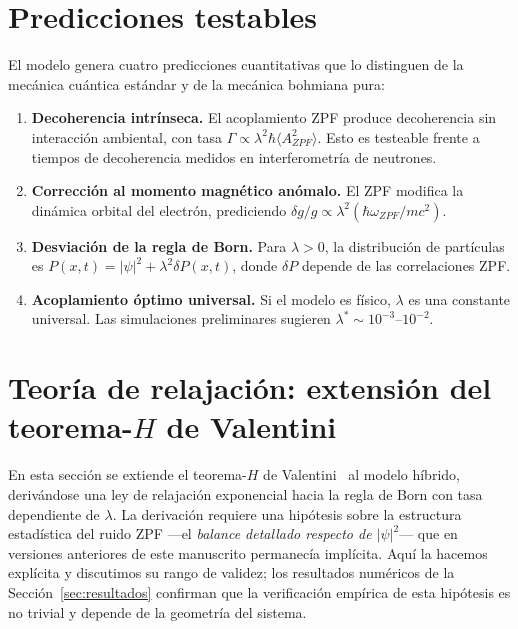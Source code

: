 \documentclass[11pt,a4paper]{article}
\begin{document}
\section{Predicciones testables}
\label{sec:predicciones}

El modelo genera cuatro predicciones cuantitativas que lo distinguen de
la mecánica cuántica estándar y de la mecánica bohmiana pura:
\begin{enumerate}
\item \textbf{Decoherencia intrínseca.} El acoplamiento ZPF produce
decoherencia sin interacción ambiental, con tasa
$\Gamma\propto\lambda^2\hbar\langle A^2_{ZPF}\rangle$. Esto es testeable
frente a tiempos de decoherencia medidos en interferometría de neutrones.
\item \textbf{Corrección al momento magnético anómalo.} El ZPF modifica
la dinámica orbital del electrón, prediciendo
$\delta g/g\propto\lambda^2(\hbar\omega_{ZPF}/mc^2)$.
\item \textbf{Desviación de la regla de Born.} Para $\lambda>0$, la
distribución de partículas es $P(x,t)=|\psi|^2+\lambda^2\delta P(x,t)$,
donde $\delta P$ depende de las correlaciones ZPF.
\item \textbf{Acoplamiento óptimo universal.} Si el modelo es físico,
$\lambda$ es una constante universal. Las simulaciones preliminares
sugieren $\lambda^*\sim 10^{-3}\text{--}10^{-2}$.
\end{enumerate}

\section{Teoría de relajación: extensión del teorema-$H$ de Valentini}
\label{sec:teoria_relajacion}

En esta sección se extiende el teorema-$H$ de
Valentini~\cite{Valentini1991a,Valentini1991b} al modelo híbrido,
derivándose una ley de relajación exponencial hacia la regla de Born con
tasa dependiente de $\lambda$. La derivación requiere una hipótesis
sobre la estructura estadística del ruido ZPF ---el \emph{balance
detallado respecto de $|\psi|^2$}--- que en versiones anteriores de este
manuscrito permanecía implícita. Aquí la hacemos explícita y discutimos
su rango de validez; los resultados numéricos de la
Sección~\ref{sec:resultados} confirman que la verificación empírica de
esta hipótesis es no trivial y depende de la geometría del sistema.
\end{document}

